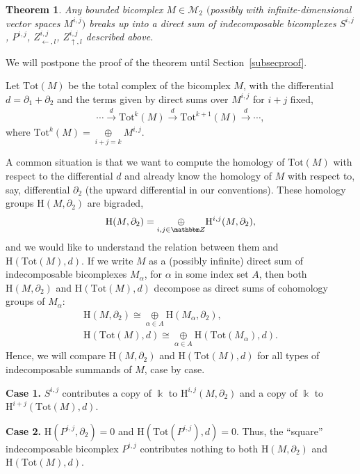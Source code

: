 \documentclass[pdftex]{sigma}
\newtheorem{thm}{Theorem}[section]
\theoremstyle{definition}
\numberwithin{equation}{section}
\def\Z{{\mathbbm Z}}
\def\dif{\partial}
\def\lra{{\longrightarrow}}
\def\mc{\mathcal}
\newcommand{\oplusop}[1]{{\mathop{\oplus}\limits_{#1}}}
\newcommand{\mH}{\mathrm{H}} %
\newcommand{\Tot}{\mathrm{Tot}}
\begin{document}
\begin{thm} \label{thmclassbicomplex}
Any bounded bicomplex $M\in \mc{M}_2$ $($possibly with infinite-dimensional
vector spaces $M^{i,j})$ breaks up into a direct sum of indecomposable bicomplexes
$S^{i,j}$, $P^{i,j}$, $Z^{i,j}_{\leftarrow,l}$, $Z^{i,j}_{\uparrow,l}$ described above.
\end{thm}

We will postpone the proof of the theorem until Section~\ref{subsecproof}.

Let $\Tot(M)$ be the total complex of the bicomplex $M$, with the
differential $d=\dif_1+\dif_2$ and the terms given by direct sums over
$M^{i,j}$ for $i+j$ fixed,
\begin{gather*}
 \cdots \stackrel{d}{\lra}
\Tot^k(M) \stackrel{d}{\lra} \Tot^{k+1}(M) \stackrel{d}{\lra} \cdots, \end{gather*}
where
$\Tot^k(M) = \oplusop{i+j=k} M^{i,j}$.


A common situation is that we want to compute the homology
of $\Tot(M)$ with respect to the differential $d$ and already
know the homology of $M$ with respect to, say, differential $\dif_2$
(the upward differential in our conventions).
These homology groups $\mH(M,\dif_2)$ are bigraded,
\begin{gather*} \mH(M,\dif_2) = \oplusop{i,j\in \Z} \mH^{i,j}(M,\dif_2) ,\end{gather*}
and we would like to understand the relation between them and
$\mH(\Tot(M),d)$.
If we write $M$ as a (possibly infinite) direct sum of indecomposable
bicomplexes $M_{\alpha}$, for $\alpha$ in some index set $A$,
then both $\mH(M,\dif_2)$ and $\mH(\Tot(M),d)$ decompose as direct sums
of cohomology groups of $M_{\alpha}$:
\begin{gather*}
 \mH(M,\dif_2) \cong \oplusop{\alpha\in A} \mH(M_{\alpha}, \dif_2), \\
 \mH(\Tot(M),d) \cong \oplusop{\alpha\in A} \mH(\Tot(M_{\alpha}), d).
\end{gather*}
Hence, we will compare $\mH(M,\dif_2)$ and $\mH(\Tot(M),d)$ for all types of indecomposable summands of $M$, case by case.

{\bf Case 1.} $S^{i,j}$ contributes a copy of $\Bbbk$ to $\mH^{i,j}(M,\dif_2)$
and a copy of $\Bbbk$ to $\mH^{i+j}(\Tot(M),d)$.

{\bf Case 2.} $\mH(P^{i,j},\dif_2)=0$ and $\mH(\Tot(P^{i,j}),d)=0$. Thus,
the ``square'' indecomposable bicomplex $P^{i,j}$ contributes nothing to both $\mH(M,\dif_2)$ and $\mH(\Tot(M),d)$.
\end{document}
